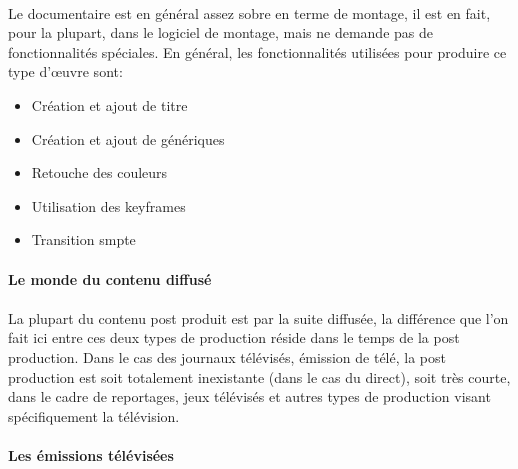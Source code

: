 \paragraph{}
Le documentaire est en général assez sobre en terme de montage, il est en
fait, pour la plupart, dans le logiciel de montage, mais ne demande pas
de fonctionnalités spéciales. En général, les fonctionnalités utilisées
pour produire ce type d'œuvre sont:
\begin{itemize} \setlength{\itemsep}{2mm}
  \item{Création et ajout de titre}
  \item{Création et ajout de génériques}
  \item{Retouche des couleurs}
  \item{Utilisation des keyframes}
  \item{Transition smpte }
\end{itemize}

\paragraph{Le monde du contenu diffusé}

\paragraph{}

La plupart du contenu post produit est par la suite diffusée, la différence que l'on
fait ici entre ces deux types de production réside dans le temps de la post production.
Dans le cas des journaux télévisés, émission de télé, la post production est soit totalement
inexistante (dans le cas du direct), soit très courte, dans le cadre de reportages, jeux télévisés
et autres types de production visant spécifiquement la télévision.

\paragraph {Les émissions télévisées}

\paragraph{}

